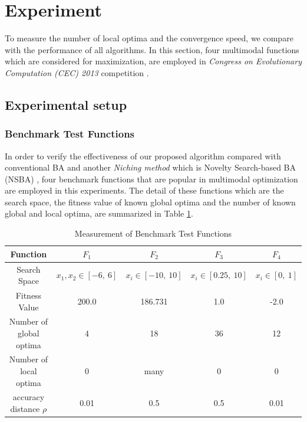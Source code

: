 \documentclass[conference]{IEEEtran}
\begin{document}
\section{Experiment}
To measure the number of local optima and the convergence speed, we compare with the performance of all algorithms. In this section, four multimodal functions which are considered for maximization, are employed in \textit{Congress on Evolutionary Computation (CEC) 2013} competition \cite{cec2013}. 

\subsection{Experimental setup}
\subsubsection{Benchmark Test Functions}
In order to verify the effectiveness of our proposed algorithm compared with conventional BA and another {\it Niching method} which is Novelty Search-based BA (NSBA) \cite{NSBA}, four benchmark functions that are popular in multimodal optimization are employed in this experiments. The detail of these functions which are the search space, the fitness value of known global optima and the number of known global and local optima, are summarized in Table \ref{tab1}.


\begin{table}[h]
\caption{Measurement of Benchmark Test Functions}
\begin{center}
\begin{tabular}{c|c|c|c|c}
\hline
Function & ${F_1}$ & ${F_2}$ & ${F_3}$ & ${F_4}$ \\
\hline
Search Space & $x_1, x_2 \in [-6, \ 6]$ & $x_i \in [-10, \ 10]$ & $x_i \in [0.25, \ 10]$ & $x_i \in [0, \ 1]$\\
\hline
Fitness Value & 200.0 & 186.731 & 1.0 & -2.0   \\
\hline
Number of global optima & 4 & 18 & 36 & 12 \\
\hline
Number of local optima &  0 & many & 0 & 0  \\
\hline
accuracy distance $\rho$ & 0.01 & 0.5 & 0.5 & 0.01 \\
\hline
\end{tabular}
\label{tab1}
\end{center}
\end{table}
\end{document}
